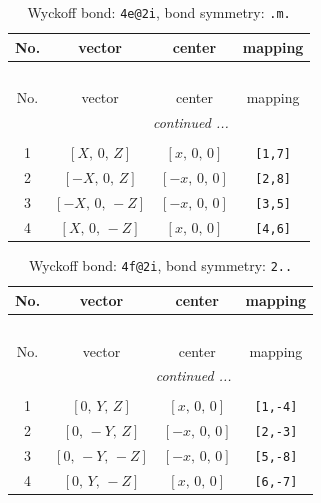 \documentclass[fleqn,8pt]{jsarticle}
\begin{document}
\renewcommand{\arraystretch}{1.2}
\begin{longtable}{cccc}
\caption{Wyckoff bond: {\tt 4e@2i}, bond symmetry: {\tt .m.}}
 \\
 \hline \hline
No. & vector & center & mapping \\ \hline \endfirsthead

\multicolumn{3}{l}{\tablename\ \thetable{}} \\
 \hline \hline
No. & vector & center & mapping \\ \hline \endhead

 \hline \hline
\multicolumn{3}{r}{\footnotesize\it continued ...} \\ \endfoot

 \hline \hline
\multicolumn{3}{r}{} \\ \endlastfoot

1 & $\left[ X,\, 0,\, Z \right]$ & $\left[ x,\, 0,\, 0 \right]$ & {\tt [1,7]} \\ \hline
2 & $\left[ - X,\, 0,\, Z \right]$ & $\left[ - x,\, 0,\, 0 \right]$ & {\tt [2,8]} \\ \hline
3 & $\left[ - X,\, 0,\, - Z \right]$ & $\left[ - x,\, 0,\, 0 \right]$ & {\tt [3,5]} \\ \hline
4 & $\left[ X,\, 0,\, - Z \right]$ & $\left[ x,\, 0,\, 0 \right]$ & {\tt [4,6]} \\
\end{longtable}
\renewcommand{\arraystretch}{1.2}
\begin{longtable}{cccc}
\caption{Wyckoff bond: {\tt 4f@2i}, bond symmetry: {\tt 2..}}
 \\
 \hline \hline
No. & vector & center & mapping \\ \hline \endfirsthead

\multicolumn{3}{l}{\tablename\ \thetable{}} \\
 \hline \hline
No. & vector & center & mapping \\ \hline \endhead

 \hline \hline
\multicolumn{3}{r}{\footnotesize\it continued ...} \\ \endfoot

 \hline \hline
\multicolumn{3}{r}{} \\ \endlastfoot

1 & $\left[ 0,\, Y,\, Z \right]$ & $\left[ x,\, 0,\, 0 \right]$ & {\tt [1,-4]} \\ \hline
2 & $\left[ 0,\, - Y,\, Z \right]$ & $\left[ - x,\, 0,\, 0 \right]$ & {\tt [2,-3]} \\ \hline
3 & $\left[ 0,\, - Y,\, - Z \right]$ & $\left[ - x,\, 0,\, 0 \right]$ & {\tt [5,-8]} \\ \hline
4 & $\left[ 0,\, Y,\, - Z \right]$ & $\left[ x,\, 0,\, 0 \right]$ & {\tt [6,-7]} \\
\end{longtable}
\end{document}
